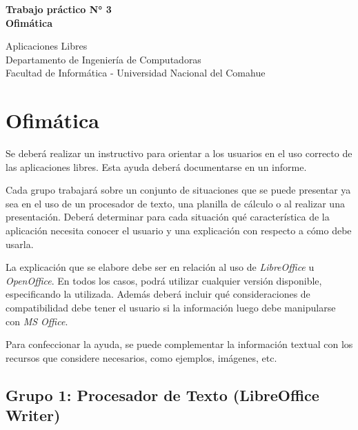 \documentclass[12pt]{article}
\def\maketitle{

 \makeatletter
 {\color{bl} \centering \huge \sc \textbf{
Trabajo práctico N° 3\\
\large \vspace*{-8pt} \color{black} Ofimática
 \vspace*{8pt} }\par}
 \makeatother


 \makeatletter
 {\centering \small 
	Aplicaciones Libres\\
 	Departamento de Ingeniería de Computadoras \\
 	Facultad de Informática - Universidad Nacional del Comahue \\
 	\vspace{20pt} }
 \makeatother

}
\begin{document}
\thispagestyle{empty}
\maketitle
\setlength{\parindent}{0pt}

\section*{Ofimática}

Se deberá realizar un instructivo para orientar a los usuarios en el uso
correcto de las aplicaciones libres. Esta ayuda deberá documentarse en un
informe.

Cada grupo trabajará sobre un conjunto de situaciones que se puede presentar
ya sea en el uso de un procesador de texto, una planilla de cálculo o al
realizar una presentación. Deberá determinar para cada situación qué
característica de la aplicación necesita conocer el usuario y una explicación
con respecto a cómo debe usarla.

La explicación que se elabore debe ser en relación al uso de
\emph{LibreOffice} u \emph{OpenOffice}. En todos los casos, podrá utilizar
cualquier versión disponible, especificando la utilizada. Además deberá
incluir qué consideraciones de compatibilidad debe tener el usuario si la
información luego debe manipularse con \emph{MS Office}.

Para confeccionar la ayuda, se puede complementar la información textual con
los recursos que considere necesarios, como ejemplos, imágenes, etc.

\subsection*{Grupo 1: Procesador de Texto (LibreOffice Writer)}
\end{document}
